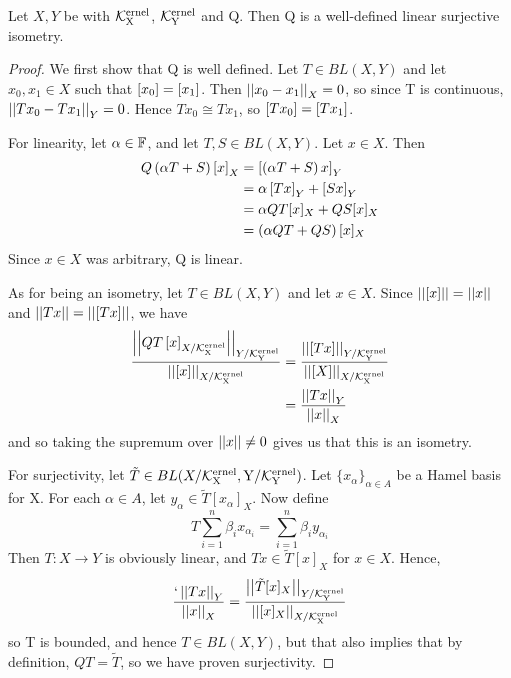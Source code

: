 \begin{prop}
\label{prop:quotientoperator}
    Let $X,Y$ be \SeminormedSpaces
    with \SeminormKernels $\bf\mathcal{K}\rm^{ernel}_X$, $\bf\mathcal{K}\rm^{ernel}_Y$
    and \OperatorQuotientMap Q. 
    Then Q is a well-defined linear surjective isometry. 
    \begin{proof} 
        We first show that Q is well defined. 
        Let $T \in BL(X,Y)$ and 
        let $x_0, x_1 \in X$ such that $\left[ x_0 \right]=\left[ x_1 \right]$. 
        Then $\left|\left| x_0-x_1 \right|\right|_X = 0$, so since T is continuous, 
        $\left|\left| Tx_0-Tx_1 \right|\right|_Y = 0$. 
        Hence $Tx_0 \cong Tx_1$, so
        $\left[ Tx_0 \right] = \left[ Tx_1 \right]$. 


        For linearity, let $\alpha\in \mathbb{F}$, and let
        $T,S \in BL(X,Y)$. 
        Let $x \in X$. 
        Then 
        \begin{align*}
            Q\left( \alpha T+S\right)\left[ x \right]_X & = \left[ \left( \alpha T+S\right)x \right]_Y\\
            & = \alpha \left[ Tx \right]_Y + \left[ Sx \right]_Y\\
            & = \alpha QT[x]_X +QS[x]_X\\
            & = \left( \alpha QT+QS\right)[x]_X
        \end{align*}
        Since $x \in X$ was arbitrary, Q is linear. 

        As for being an isometry, let $T \in BL(X,Y)$ and let $x \in X$. 
        Since $\left|\left| \left[ x \right] \right|\right|=\left|\left| x \right|\right|$ and $\left|\left| Tx \right|\right|=\left|\left| \left[ Tx \right] \right|\right|$, 
        we have 
        \begin{align*}
        \frac{\left|\left| QT\left[ x \right]_{X/\bf\mathcal{K}\rm^{ernel}_X} \right|\right|_{Y/\bf\mathcal{K}\rm^{ernel}_Y}}{\left|\left| \left[ x \right] \right|\right|_{X/\bf\mathcal{K}\rm^{ernel}_X}}  & =  \frac{\left|\left| \left[ Tx \right] \right|\right|_{Y/\bf\mathcal{K}\rm^{ernel}_Y}}{\left|\left| \left[ X \right] \right|\right|_{X/\bf\mathcal{K}\rm^{ernel}_X}}\\
        & = \frac{\left|\left| Tx \right|\right|_Y}{\left|\left| x \right|\right|_X} 
        \end{align*}
        and so taking the supremum over $\left|\left| x \right|\right| \neq 0$ gives us 
        that this is an isometry. 
        

        For surjectivity, let $\tilde{T} \in BL(X/\bf\mathcal{K}\rm^{ernel}_X, Y/\bf\mathcal{K}\rm^{ernel}_Y)$.
        Let $\{x_\alpha\}_{\alpha \in A}$ be a Hamel basis for X. 
        For each $\alpha \in A$, 
        let $y_\alpha \in \tilde{T}[x_\alpha]_X$. 
        Now define 
        \begin{equation}
            T\sum_{i=1}^n \beta_i x_{\alpha_i} = \sum_{i=1}^n \beta_i y_{\alpha_i}
        \end{equation}
        Then $T:X \to Y$ is obviously linear, and
        $Tx \in \tilde{T}[x]_X$ for $x \in X$. 
        Hence, 
        \begin{equation}
            \frac{`\left|\left| Tx \right|\right|_{Y}}{\left|\left| x \right|\right|_X} = \frac{\left|\left| \tilde{T}[x]_X \right|\right|_{Y/\bf\mathcal{K}\rm^{ernel}_Y}}{\left|\left| [x]_X \right|\right|_{X/\bf\mathcal{K}\rm^{ernel}_X}}
        \end{equation}
        so T is bounded, and hence $T \in BL(X,Y)$, 
        but that also implies that by definition, 
        $QT=\tilde{T}$, so we have proven surjectivity. 
    \end{proof}

\end{prop}
